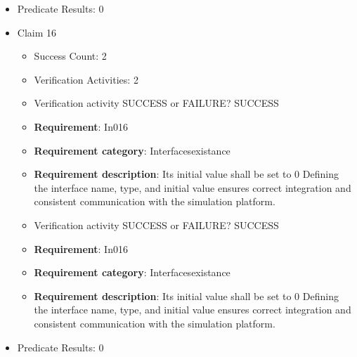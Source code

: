 \documentclass{article}
\begin{document}
\begin{itemize}
\begin{itemize}
					\item Verification activity SUCCESS or FAILURE? SUCCESS
		
						\item \textbf{Requirement}: In015 
						\item \textbf{Requirement category}: Interfacesexistance 
						\item \textbf{Requirement description}: Its initial value shall be set to 0 Defining the interface name, type, and initial value ensures correct integration and consistent communication with the simulation platform.
					
				\end{itemize}
				
									    
				\item Predicate Results: 0

  				  \item Claim 16
				\begin{itemize}
			    	\item Success Count: 2 
			    	\item Verification Activities: 2
					\item Verification activity SUCCESS or FAILURE? SUCCESS
		
						\item \textbf{Requirement}: In016 
						\item \textbf{Requirement category}: Interfacesexistance 
						\item \textbf{Requirement description}: Its initial value shall be set to 0 Defining the interface name, type, and initial value ensures correct integration and consistent communication with the simulation platform.
					
					\item Verification activity SUCCESS or FAILURE? SUCCESS
		
						\item \textbf{Requirement}: In016 
						\item \textbf{Requirement category}: Interfacesexistance 
						\item \textbf{Requirement description}: Its initial value shall be set to 0 Defining the interface name, type, and initial value ensures correct integration and consistent communication with the simulation platform.
					
				\end{itemize}
				
									    
				\item Predicate Results: 0


\end{itemize}
\end{document}

